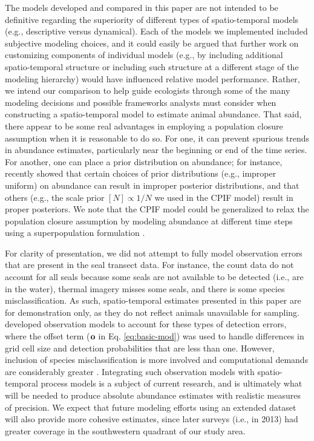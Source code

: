 \documentclass[12pt,english]{article}
\begin{document}
\begin{spacing}{1.9}
The models developed and compared in this paper are not intended to be definitive regarding the superiority
of different types of spatio-temporal models (e.g., descriptive versus dynamical).  Each of the models we implemented included subjective modeling choices, and it could easily be argued that further work on customizing components of individual models (e.g., by including additional spatio-temporal structure or including such structure at a different stage of the modeling hierarchy) would have influenced relative model performance.  Rather, we intend our comparison to help guide ecologists through some of the many modeling decisions and possible frameworks analysts must consider when constructing a spatio-temporal model to estimate animal abundance.  That said, there appear to be some real advantages in employing a population closure assumption when it is reasonable to do so.  For one, it can prevent spurious trends in abundance estimates, particularly near the beginning or end of the time series.  For another, one can place a prior distribution on abundance; for instance, \citet{Link2013} recently showed that certain choices of prior distributions (e.g., improper uniform) on abundance can result in improper posterior distributions, and that others (e.g., the scale prior $[N] \propto 1/N$ we used in the CPIF model) result in proper posteriors.  We note that the CPIF model could be generalized to relax the population closure assumption by modeling abundance at different time steps using a superpopulation formulation \citep[as with the Schwarz-Arnason parameterization of the Jolly-Seber model; cf.][]{SchwarzArnason1996}.

For clarity of presentation, we did not attempt to fully model observation errors that are present in the seal transect data.  For instance, the count data do not account for all seals because some seals are not available to be detected (i.e., are in the water), thermal imagery misses some seals, and there is some species misclassification. As such, spatio-temporal estimates presented in this paper are for demonstration only, as they do not reflect animals unavailable for sampling. \citet{ConnEtAl2014} developed observation models to account for these types of detection errors, where the offset term (${\bf o}$ in Eq. \ref{eq:basic-mod}) was used to handle differences in grid cell size and detection probabilities that are less than one.  However, inclusion of species misclassification is more involved and computational demands are considerably greater \citep{Conn2013}.  Integrating such observation models with spatio-temporal process models is a subject of current research, and is ultimately what will be needed to produce absolute abundance estimates with realistic measures of precision.  We expect that future modeling efforts using an extended dataset will also provide more cohesive estimates, since later surveys (i.e., in 2013) had greater coverage in the southwestern quadrant of our study area.


\end{spacing}
\end{document}
